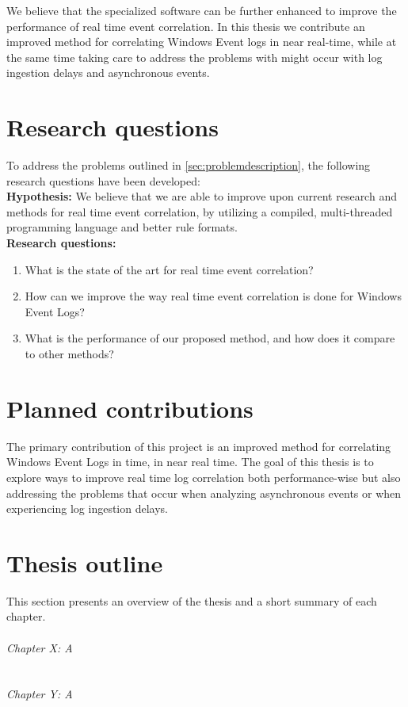 We believe that the specialized software can be further enhanced to improve the performance of real time event correlation. In this thesis we contribute an improved method for correlating Windows Event logs in near real-time, while at the same time taking care to address the problems with might occur with log ingestion delays and asynchronous events.

\section{Research questions}
\label{sec:researchquestions}
To address the problems outlined in \ref{sec:problemdescription}, the following research questions have been developed:\\
\textbf{Hypothesis:} We believe that we are able to improve upon current research and methods for real time event correlation, by utilizing a compiled, multi-threaded programming language and better rule formats.\\
\textbf{Research questions:}
\begin{enumerate}
    \item What is the state of the art for real time event correlation?
    \item How can we improve the way real time event correlation is done for Windows Event Logs? %
    \item What is the performance of our proposed method, and how does it compare to other methods?
\end{enumerate}

\section{Planned contributions}
\label{sec:plannedcontributions}

The primary contribution of this project is an improved method for correlating Windows Event Logs in time, in near real time. The goal of this thesis is to explore ways to improve real time log correlation both performance-wise but also addressing the problems that occur when analyzing asynchronous events or when experiencing log ingestion delays.

\section{Thesis outline}
\label{sec:thesisoutline}
This section presents an overview of the thesis and a short summary of each chapter.\\\\
\textit{Chapter X: A}\\
\\\\
\textit{Chapter Y: A}\\
